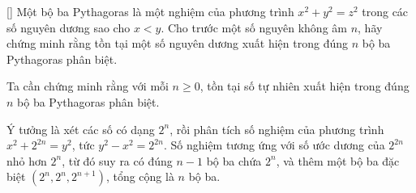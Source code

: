 \documentclass[../09-contruction-methods.tex]{subfiles}
\begin{document}
\begin{example*}\label{example:ROU-2015-TST-D1-P3}[\textbf{}]
    Một bộ ba Pythagoras là một nghiệm của phương trình \( x^2 + y^2 = z^2 \) trong các số nguyên dương sao cho \( x < y \).
    Cho trước một số nguyên không âm \( n \), hãy chứng minh rằng tồn tại một số nguyên dương xuất hiện trong đúng \( n \) bộ ba Pythagoras phân biệt.
\end{example*}

\begin{story*}
    Ta cần chứng minh rằng với mỗi \( n \ge 0 \), tồn tại số tự nhiên xuất hiện trong đúng \( n \) bộ ba Pythagoras phân biệt.

    Ý tưởng là xét các số có dạng \( 2^n \), rồi phân tích số nghiệm của phương trình \( x^2 + 2^{2n} = y^2 \),
    tức \( y^2 - x^2 = 2^{2n} \). Số nghiệm tương ứng với số ước dương của \( 2^{2n} \) nhỏ hơn \( 2^n \),
    từ đó suy ra có đúng \( n - 1 \) bộ ba chứa \( 2^n \), và thêm một bộ ba đặc biệt \( (2^n, 2^n, 2^{n+1}) \),
    tổng cộng là \( n \) bộ ba.
\end{story*}

\bigbreak
\end{document}
